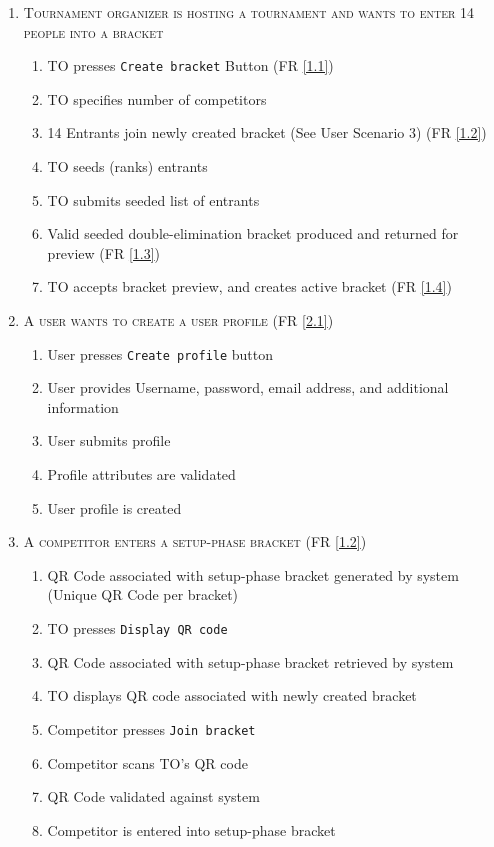 \documentclass{article}
\begin{document}
\begin{enumerate}
\item{\textsc{Tournament organizer is hosting a tournament and wants to enter 14 people into a bracket }}    \begin{enumerate}[label*=\arabic*.]

\item TO presses \texttt{Create bracket} Button (FR \ref{1.1})
\item TO specifies number of competitors
\item 14 Entrants join newly created bracket (See User Scenario 3) (FR \ref{1.2})
\item TO seeds (ranks) entrants
\item TO submits seeded list of entrants 
\item Valid seeded double-elimination bracket produced and returned for preview (FR \ref{1.3})
\item TO accepts bracket preview, and creates active bracket
(FR \ref{1.4})
\end{enumerate}
\item{\textsc{A user wants to create a user profile}} (FR \ref{2.1})   \begin{enumerate}[label*=\arabic*.]

\item User presses \texttt{Create profile} button
\item User provides Username, password, email address, and additional information
\item User submits profile 
\item Profile attributes are validated 
\item User profile is created
\end{enumerate}
\item{\textsc{A competitor enters a setup-phase bracket}}   (FR \ref{1.2}) \begin{enumerate}[label*=\arabic*.]

\item QR Code associated with setup-phase bracket generated by system (Unique QR Code per bracket) 
\item TO presses \texttt{Display QR code}
\item QR Code associated with setup-phase bracket retrieved by system
\item TO displays QR code associated with newly created bracket
\item Competitor presses \texttt{Join bracket}
\item Competitor scans TO’s QR code
\item QR Code validated against system
\item Competitor is entered into setup-phase bracket
\end{enumerate}


\end{enumerate}
\end{document}
